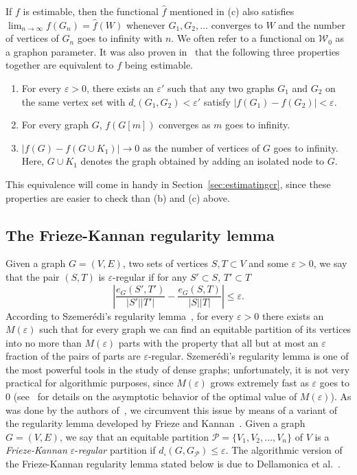 \documentclass{article}
\begin{document}
If $f$ is estimable, then the functional $\hat{f}$ mentioned in (c) also satisfies $\lim_{n\rightarrow\infty}f(G_n)=\hat f(W)$ whenever $G_1,G_2,\dots$ converges to $W$ and the number of vertices of $G_n$ goes to infinity with $n$. We often refer to a functional on $\mathcal{W}_0$ as a graphon parameter. It was also proven in~\cite{borgslimits} that the following three properties together are equivalent to $f$ being estimable.

\begin{enumerate}[label=(\roman*)]
    \item For every $\varepsilon>0$, there exists an $\varepsilon'$ such that any two graphs $G_1$ and $G_2$ on the same vertex set with $d_\square(G_1,G_2)<\varepsilon'$ satisfy $|f(G_1)-f(G_2)|<\varepsilon$.
    
    \item For every graph $G$, $f(G[m])$ converges as $m$ goes to infinity.

    \item  $|f(G)-f(G\cup K_1)|\rightarrow0$ as the number of vertices of $G$ goes to infinity. Here, $G\cup K_1$ denotes the graph obtained by adding an isolated node to $G$.
\end{enumerate}

This equivalence will come in handy in Section~\ref{sec:estimatingcr}, since these properties are easier to check than (b) and (c) above.

\subsection{The Frieze-Kannan regularity lemma}\label{sec:Frieze-Kannan}
Given a graph $G=(V,E)$, two sets of vertices $S,T\subset V$ and some $\varepsilon>0$, we say that the pair $(S,T)$ is $\varepsilon$-regular if for any $S'\subset S$, $T'\subset T$ \[\left|\frac{e_G(S',T')}{|S'||T'|}-\frac{e_G(S,T)}{|S||T|}\right|\leq\varepsilon.\] According to Szemerédi's regularity lemma~\cite{Szemeredi}, for every $\varepsilon>0$ there exists an $M(\varepsilon)$ such that for every graph we can find an equitable partition of its vertices into no more than $M(\varepsilon)$ parts with the property that all but at most an $\varepsilon$ fraction of the pairs of parts are $\varepsilon$-regular. Szemerédi's regularity lemma is one of the most powerful tools in the study of dense graphs; unfortunately, it is not very practical for algorithmic purposes, since $M(\varepsilon)$ grows extremely fast as $\varepsilon$ goes to $0$ (see~\cite{gowersregularity} for details on the asymptotic behavior of the optimal value of $M(\varepsilon)$). As was done by the authors of~\cite{approximatingrect}, we circumvent this issue by means of a variant of the regularity lemma developed by Frieze and Kannan~\cite{FriKan}. Given a graph $G=(V,E)$, we say that an equitable partition $\mathcal{P}=\{V_1,V_2,\dots,V_n\}$ of $V$ is a \textit{Frieze-Kannan} $\varepsilon$-\textit{regular} partition if $d_\square(G,G_\mathcal{P})\leq\varepsilon$. The algorithmic version of the Frieze-Kannan regularity lemma stated below is due to Dellamonica et al.~\cite{FriKanAlgorithm}.
\end{document}
